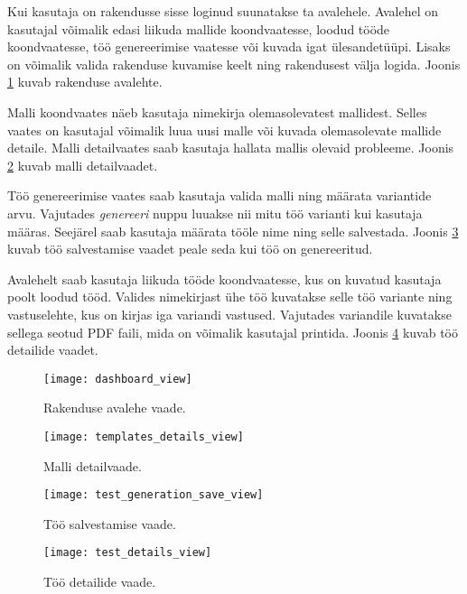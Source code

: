 Kui kasutaja on rakendusse sisse loginud suunatakse ta avalehele. Avalehel on kasutajal võimalik edasi liikuda mallide koondvaatesse, loodud tööde koondvaatesse, töö genereerimise vaatesse või kuvada igat ülesandetüüpi. Lisaks on võimalik valida rakenduse kuvamise keelt ning rakendusest välja logida. Joonis \ref{fig:dashboard-view} kuvab rakenduse avalehte.

Malli koondvaates näeb kasutaja nimekirja olemasolevatest mallidest. Selles vaates on kasutajal võimalik luua uusi malle või kuvada olemasolevate mallide detaile. Malli detailvaates saab kasutaja hallata mallis olevaid probleeme. Joonis \ref{fig:template-details-view} kuvab malli detailvaadet.

Töö genereerimise vaates saab kasutaja valida malli ning määrata variantide arvu. Vajutades \textit{genereeri} nuppu luuakse nii mitu töö varianti kui kasutaja määras. Seejärel saab kasutaja määrata tööle nime ning selle salvestada. Joonis \ref{fig:test-generation-save-view} kuvab töö salvestamise vaadet peale seda kui töö on genereeritud.

Avalehelt saab kasutaja liikuda tööde koondvaatesse, kus on kuvatud kasutaja poolt loodud tööd. Valides nimekirjast ühe töö kuvatakse selle töö variante ning vastuselehte, kus on kirjas iga variandi vastused. Vajutades variandile kuvatakse sellega seotud PDF faili, mida on võimalik kasutajal printida. Joonis \ref{fig:test-details-view} kuvab töö detailide vaadet.

\begin{figure}[H]
    \centering
    \texttt{[image: dashboard\_view]}
    \caption{Rakenduse avalehe vaade.}
    \label{fig:dashboard-view}
\end{figure}

\begin{figure}[H]
    \centering
    \texttt{[image: templates\_details\_view]}
    \caption{Malli detailvaade.}
    \label{fig:template-details-view}
\end{figure}

\begin{figure}[H]
    \centering
    \texttt{[image: test\_generation\_save\_view]}
    \caption{Töö salvestamise vaade.}
    \label{fig:test-generation-save-view}
\end{figure}

\begin{figure}[H]
    \centering
    \texttt{[image: test\_details\_view]}
    \caption{Töö detailide vaade.}
    \label{fig:test-details-view}
\end{figure}

